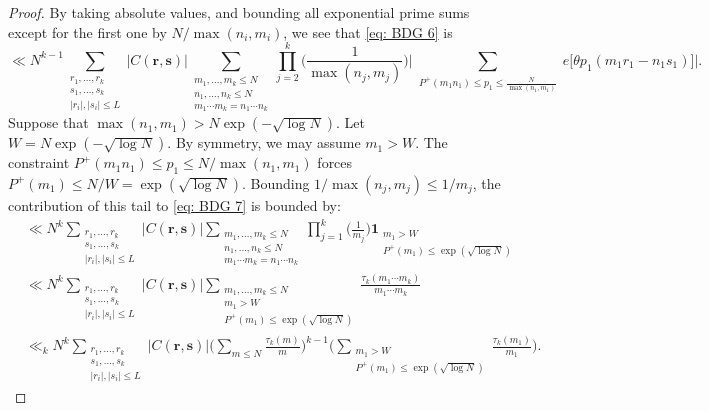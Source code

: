 \documentclass[12pt]{amsart}
\renewcommand{\le}{\leqslant}
\renewcommand{\leq}{\leqslant}
\numberwithin{equation}{section}
\theoremstyle{plain}
\theoremstyle{definition}
\begin{document}
\begin{proof}
		By taking absolute values, and bounding all exponential prime sums except for the first one by $N/\max(n_i,m_i)$, we see that \eqref{eq: BDG 6} is 
		\begin{equation}\label{eq: BDG 7}
			\ll N^{k-1}\sum_{\substack{r_1,\dots ,r_k \\ s_1,\dots ,s_k \\ |r_i|,|s_i| \leq L}}|C(\bm{r,s})|\sum_{\substack{m_1,\dots, m_k\leq N\\ n_1,\dots ,n_k \leq N\\ m_1\cdots m_k=n_1 \cdots n_k}} \prod_{j = 2}^{k} \bigg(\frac{1}{\max(n_j,m_j)}\bigg) \bigg| \sum_{\substack{ P^+(m_1n_1) \leq p_1 \leq \frac{N}{\max(n_1,m_1)}}} e\big[\theta p_1(m_1r_1-n_1s_1)\big]\bigg|.
		\end{equation}
		Suppose that $\max(n_1,m_1) > N \exp(-\sqrt{\log N}).$ Let $W = N \exp(-\sqrt{\log N})$. By symmetry, we may assume $m_1 > W$. The constraint $P^+(m_1n_1) \le p_1 \le N/\max(n_1,m_1)$ forces $P^+(m_1) \le N/W = \exp(\sqrt{\log N})$. Bounding $1/\max(n_j, m_j) \le 1/m_j$, the contribution of this tail to \eqref{eq: BDG 7} is bounded by:
		\begin{align*}
			&\ll N^{k}\sum_{\substack{r_1,\dots ,r_k \\ s_1,\dots ,s_k \\ |r_i|,|s_i| \leq L}}|C(\bm{r,s})|\sum_{\substack{m_1,\dots, m_k\leq N\\ n_1,\dots ,n_k \leq N\\ m_1\cdots m_k=n_1 \cdots n_k}} \prod_{j = 1}^{k} \bigg(\frac{1}{m_j}\bigg) \bm{1}_{\substack{m_1 > W \\ P^+(m_1) \le \exp(\sqrt{\log N})}}\\
			&\ll N^{k}\sum_{\substack{r_1,\dots ,r_k \\ s_1,\dots ,s_k \\ |r_i|,|s_i| \leq L}}|C(\bm{r,s})|\sum_{\substack{ m_1,\dots ,m_k \leq N\\ m_1 > W \\ P^+(m_1) \le \exp(\sqrt{\log N})}} \frac{\tau_k(m_1\cdots m_k)}{m_1\cdots m_k}\\
			&\ll_k N^{k}\sum_{\substack{r_1,\dots ,r_k \\ s_1,\dots ,s_k \\ |r_i|,|s_i| \leq L}}|C(\bm{r,s})| \bigg(\sum_{m \leq N} \frac{\tau_k(m)}{m}\bigg)^{k-1}\bigg(\sum_{\substack{ m_1 > W \\ P^+(m_1) \leq \exp(\sqrt{\log N})}} \frac{\tau_k(m_1)}{m_1}\bigg).
		\end{align*}
		

\end{proof}
\end{document}
